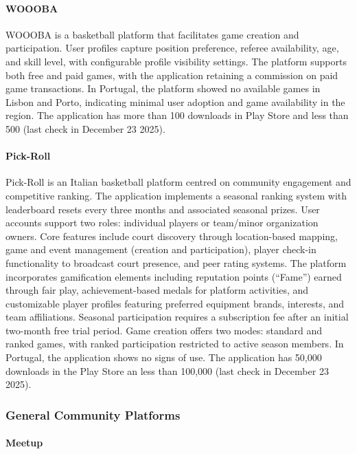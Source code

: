 \paragraph{\textbf{WOOOBA}}

WOOOBA is a basketball platform that facilitates game creation and participation. User profiles capture position preference, referee availability, age, and skill level, with configurable profile visibility settings. The platform supports both free and paid games, with the application retaining a commission on paid game transactions. In Portugal, the platform showed no available games in Lisbon and Porto, indicating minimal user adoption and game availability in the region. The application has more than 100 downloads in Play Store and less than 500 (last check in December 23 2025).

\paragraph{\textbf{Pick-Roll}} 

Pick-Roll is an Italian basketball platform centred on community engagement and competitive ranking. The application implements a seasonal ranking system with leaderboard resets every three months and associated seasonal prizes. User accounts support two roles: individual players or team/minor organization owners. Core features include court discovery through location-based mapping, game and event management (creation and participation), player check-in functionality to broadcast court presence, and peer rating systems. The platform incorporates gamification elements including reputation points (``Fame'') earned through fair play, achievement-based medals for platform activities, and customizable player profiles featuring preferred equipment brands, interests, and team affiliations. Seasonal participation requires a subscription fee after an initial two-month free trial period. Game creation offers two modes: standard and ranked games, with ranked participation restricted to active season members. In Portugal, the application shows no signs of use. The application has 50,000 downloads in the Play Store an less than 100,000 (last check in December 23 2025).

\subsubsection{General Community Platforms}

\paragraph{\textbf{Meetup}} 

